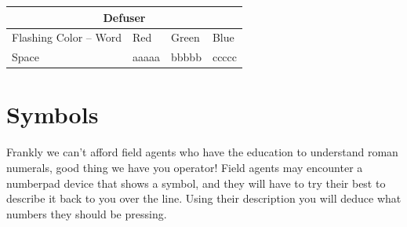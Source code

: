 \documentclass{article}
\begin{document}
\begin{center}
\begin{tabular}{ |p{3cm}||p{3cm}|p{3cm}|p{3cm}|  }
 \hline
 \multicolumn{4}{|c|}{Defuser} \\
 \hline
 Flashing Color -- Word& Red & Green & Blue\\
 \hline
 Space   & aaaaa    &bbbbb&   ccccc\\
 \hline
\end{tabular}
\end{center}

\newpage
\BgThispage
\section* {Symbols}
Frankly we can't afford field agents who have the education to understand roman numerals, good thing we have you operator! Field agents may encounter a numberpad device that shows a symbol, and they will have to try their best to describe it back to you over the line. Using their description you will deduce what numbers they should be pressing.
\end{document}
